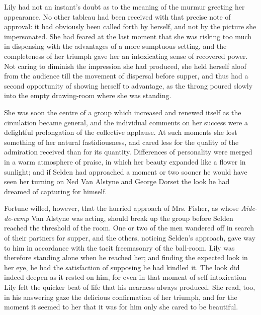 \documentclass[12pt,a4paper]{book}
\begin{document}
Lily had not an instant's doubt as to the meaning of the murmur
greeting her appearance. No other tableau had been received with
that precise note of approval: it had obviously been called forth
by herself, and not by the picture she impersonated. She had
feared at the last moment that she was risking too much in
dispensing with the advantages of a more sumptuous setting, and
the completeness of her triumph gave her an intoxicating sense of
recovered power. Not caring to diminish the impression she had
produced, she held herself aloof from the audience till the
movement of dispersal before supper, and thus had a second
opportunity of showing herself to advantage, as the throng poured
slowly into the empty drawing-room where she was standing.





She was soon the centre of a group which increased and renewed
itself as the circulation became general, and the individual
comments on her success were a delightful prolongation of
the collective applause. At such moments she lost something of
her natural fastidiousness, and cared less for the quality of the
admiration received than for its quantity. Differences of
personality were merged in a warm atmosphere of praise, in which
her beauty expanded like a flower in sunlight; and if Selden had
approached a moment or two sooner he would have seen her turning
on Ned Van Alstyne and George Dorset the look he had dreamed of
capturing for himself.





Fortune willed, however, that the hurried approach of Mrs.
Fisher, as whose \textit{Aide}-\textit{de}-\textit{camp} Van Alstyne was acting, should
break up the group before Selden reached the threshold of the
room. One or two of the men wandered off in search of their
partners for supper, and the others, noticing Selden's approach,
gave way to him in accordance with the tacit freemasonry of the
ball-room. Lily was therefore standing alone when he reached her;
and finding the expected look in her eye, he had the satisfaction
of supposing he had kindled it. The look did indeed deepen as it
rested on him, for even in that moment of self-intoxication Lily
felt the quicker beat of life that his nearness always produced. 
She read, too, in his answering gaze the delicious confirmation
of her triumph, and for the moment it seemed to her that it was
for him only she cared to be beautiful.
\end{document}
